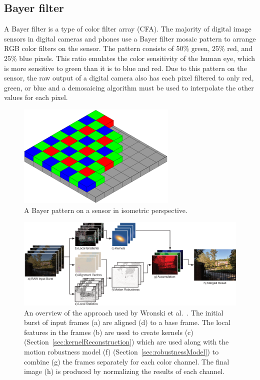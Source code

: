 \documentclass{sig-alternate}
\begin{document}

\subsection{Bayer filter}
\label{sec:background:bayerFilter}

A Bayer filter is a type of color filter array (CFA). The majority of digital image sensors in digital cameras and phones use a Bayer filter mosaic pattern to arrange RGB color filters on the sensor. The pattern consists of 50\% green, 25\% red, and 25\% blue pixels. This ratio emulates the color sensitivity of the human eye, which is more sensitive to green than it is to blue and red. Due to this pattern on the sensor, the raw output of a digital camera also has each pixel filtered to only red, green, or blue and a demosaicing algorithm must be used to interpolate the other values for each pixel.~\cite{wiki:BayerFilter}

\begin{figure}
\centering
\includegraphics[width=3in]{Bayer_pattern_on_sensor}
\caption{A Bayer pattern on a sensor in isometric perspective.~\cite{wiki:BayerFilter}}
\label{fig:BayerPattern}
\end{figure}

\begin{figure}[t]
\centering
\includegraphics[width=7in]{Wronski2019-figure-2}
\caption{An overview of the approach used by Wronski et al.~\cite{Wronski2019}. The initial burst of input frames (a) are aligned (d) to a base frame. The local features in the frames (b) are used to create kernels (c) (Section~\ref{sec:kernelReconstruction}) which are used along with the motion robustness model (f) (Section~\ref{sec:robustnessModel}) to combine (g) the frames separately for each color channel. The final image (h) is produced by normalizing the results of each channel.}
\label{fig:Wronski2019Fig2}
\end{figure}
\end{document}
